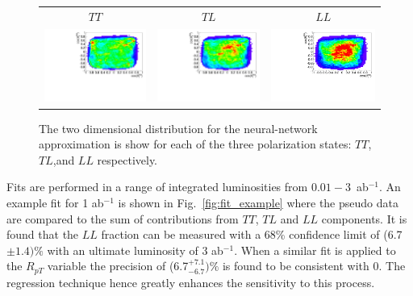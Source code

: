 \documentclass[aps,prl,twocolumn,showpacs,superscriptaddress,groupeaddress,floatfix]{revtex4}
\begin{document}
\begin{figure}
\begin{tabular}{ccc}
$TT$ &$TL$&$LL$\\
\includegraphics[width=.32\textwidth,height=.18\textheight]{fig_02a.pdf}&
\includegraphics[width=.32\textwidth,height=.18\textheight]{fig_02b.pdf}&
\includegraphics[width=.32\textwidth,height=.18\textheight]{fig_02c.pdf}\\
\end{tabular}
\caption{\label{fig:2d_templates} The two dimensional distribution for the neural-network approximation is show for each of the three polarization states: $TT$,$TL$,and $LL$ respectively.}
\end{figure}


Fits are performed in a range of integrated luminosities from $0.01-3$~ab$^{-1}$. An example fit for 1 ab$^{-1}$ is shown in Fig.~\ref{fig:fit_example} where the pseudo data are compared to the sum of 
contributions from $TT$, $TL$ and $LL$ components. It is found that the $LL$ fraction can be measured with a 68\% confidence limit of (6.7$\pm 1.4)\%$ with an ultimate luminosity of 3 ab$^{-1}$. When a similar fit is applied to the $R_{pT}$ variable the precision of (6.7$^{+7.1}_{- 6.7})\%$ is found to be consistent with 0. The regression technique hence greatly enhances the sensitivity to this process.
\end{document}

